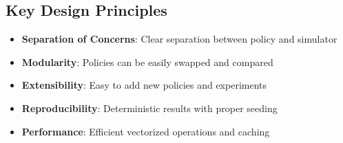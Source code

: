 \documentclass[11pt, letterpaper]{article}
\begin{document}
\subsection{Key Design Principles}
\begin{itemize}
    \item \textbf{Separation of Concerns}: Clear separation between policy and simulator
    \item \textbf{Modularity}: Policies can be easily swapped and compared
    \item \textbf{Extensibility}: Easy to add new policies and experiments
    \item \textbf{Reproducibility}: Deterministic results with proper seeding
    \item \textbf{Performance}: Efficient vectorized operations and caching
\end{itemize}
\end{document}
